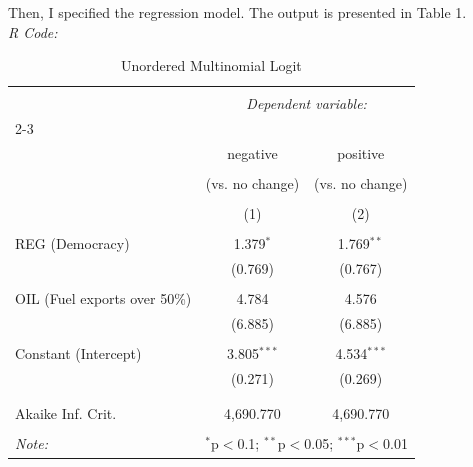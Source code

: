 \documentclass[12pt,letterpaper]{article}
\begin{document}
\noindent Then, I specified the regression model. The output is presented in Table 1.\\
\noindent\textit{R Code:}
  
  
\begin{table}[H] \centering 
	\caption{Unordered Multinomial Logit} 
	\label{} 
	\begin{tabular}{@{\extracolsep{5pt}}lcc} 
		\\[-1.8ex]\hline 
		\hline \\[-1.8ex] 
		& \multicolumn{2}{c}{\textit{Dependent variable:}} \\ 
		\cline{2-3} 
		\\[-1.8ex] & negative  & positive \\ 
		\\[-1.8ex] & (vs. no change) & (vs. no change) \\ 
		\\[-1.8ex] & (1) & (2)\\ 
		\hline \\[-1.8ex] 
		REG (Democracy) & 1.379$^{*}$ & 1.769$^{**}$ \\ 
		& (0.769) & (0.767) \\ 
		& & \\ 
		OIL (Fuel exports over 50\%) & 4.784 & 4.576 \\ 
		& (6.885) & (6.885) \\ 
		& & \\ 
		Constant (Intercept) & 3.805$^{***}$ & 4.534$^{***}$ \\ 
		& (0.271) & (0.269) \\ 
		& & \\ 
		\hline \\[-1.8ex] 
		Akaike Inf. Crit. & 4,690.770 & 4,690.770 \\ 
		\hline 
		\hline \\[-1.8ex] 
		\textit{Note:}  & \multicolumn{2}{r}{$^{*}$p$<$0.1; $^{**}$p$<$0.05; $^{***}$p$<$0.01} \\ 
	\end{tabular} 
\end{table}
\end{document}
